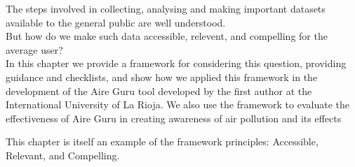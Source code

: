 The steps involved in collecting, analysing and making important datasets available to the general public are well understood. \\

But how do we make such data accessible, relevent, and compelling for the average user? \\

In this chapter we provide a framework for considering this question, providing guidance and checklists,
and show how we applied this framework in the development of the Aire Guru tool developed by the first
author at the International University of La Rioja.
We also use the framework to evaluate the effectiveness of Aire Guru in creating awareness of air pollution and its effects

This chapter is itself an example of the framework principles: Accessible, Relevant, and Compelling. \\